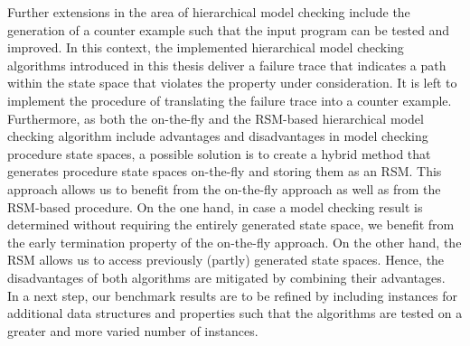 \documentclass[a4paper, 12pt, twoside]{report}
\begin{document}
	Further extensions in the area of hierarchical model checking include the generation of a counter example such that the input program can be tested and improved. In this context, the implemented hierarchical model checking algorithms introduced in this thesis deliver a failure trace that indicates a path within the state space that violates the property under consideration. It is left to implement the procedure of translating the failure trace into a counter example.\\
	
	Furthermore, as both the on-the-fly and the RSM-based hierarchical model checking algorithm include advantages and disadvantages in model checking procedure state spaces, a possible solution is to create a hybrid method that generates procedure state spaces on-the-fly and storing them as an RSM. This approach allows us to benefit from the on-the-fly approach as well as from the RSM-based procedure. On the one hand, in case a model checking result is determined without requiring the entirely generated state space, we benefit from the early termination property of the on-the-fly approach. On the other hand, the RSM allows us to access previously (partly) generated state spaces. Hence, the disadvantages of both algorithms are mitigated by combining their advantages. \\
	
	In a next step, our benchmark results are to be refined by including instances for additional data structures and properties such that the algorithms are tested on a greater and more varied number of instances.	
	
	
	{}
	
\end{document}
